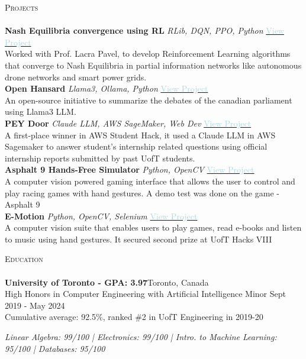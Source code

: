 \documentclass[a4paper]{article}
\newcommand{\lineunder} {
    \vspace*{-8pt} \\
    \hspace*{-18pt} \hrulefill \\
}
\newcommand{\header} [1] {
    {\hspace*{-18pt}\vspace*{6pt} \textsc{#1}}
    \vspace*{-6pt} \lineunder
}
\begin{document}
\header{Projects}
{\textbf{Nash Equilibria convergence using RL}} {\sl RLib, DQN, PPO, Python} \hfill \href{https://github.com/BoundlessDevelopment/Capstone-Project}{\textcolor{lightblue}{View Project}}\\
Worked with Prof. Lacra Pavel, to develop Reinforcement Learning algorithms that converge to Nash Equilibria in partial information networks
 like autonomous drone networks and smart power grids.\\
\vspace*{1mm}
{\textbf{Open Hansard}} {\sl Llama3, Ollama, Python} \hfill \href{https://github.com/pandyah5/open-hansard}{\textcolor{lightblue}{View Project}}\\
An open-source initiative to summarize the debates of the canadian parliament using Llama3 LLM.\\
\vspace*{1mm}
{\textbf{PEY Door}} {\sl Claude LLM, AWS SageMaker, Web Dev} \hfill \href{https://devpost.com/software/peydoor}{\textcolor{lightblue}{View Project}}\\
A first-place winner in AWS Student Hack, it used a Claude LLM in AWS Sagemaker to answer student's internship related questions using official internship reports submitted by past UofT students.\\
\vspace*{1mm}
{\textbf{Asphalt 9 Hands-Free Simulator}} {\sl Python, OpenCV} \hfill \href{https://github.com/pandyah5/asphalt9_OpenCV_Simulation?tab=readme-ov-file}{\textcolor{lightblue}{View Project}} \\
A computer vision powered gaming interface that allows the user to control and play racing games with hand gestures. A demo test was done on the game - Asphalt 9\\
\vspace*{1mm}
{\textbf{E-Motion}} {\sl Python, OpenCV, Selenium} \hfill \href{https://devpost.com/software/e-motion-otbl2i}{\textcolor{lightblue}{View Project}} \\
A computer vision suite that enables users to play games, read e-books and listen to music using hand gestures. It secured second prize at UofT Hacks VIII\\

\vspace{2mm}

\header{Education}
\textbf{University of Toronto - GPA: 3.97}\hfill Toronto, Canada\\
High Honors in Computer Engineering with Artificial Intelligence Minor \hfill Sept 2019 - May 2024\\
Cumulative average: 92.5\%, ranked \#2 in UofT Engineering in 2019-20
\linebreak\\
\vspace{-3.5mm}
\begin{footnotesize}
\textit{Linear Algebra: 99/100 | Electronics: 99/100 | 
 Intro. to Machine Learning: 95/100 | Databases: 95/100}
\end{footnotesize}
\vspace{2mm}
\end{document}
